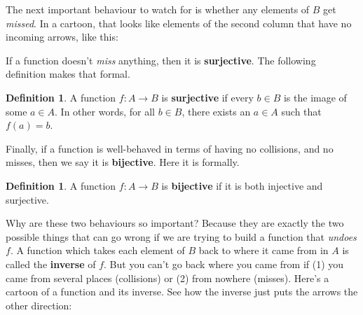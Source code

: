 \documentclass{article}
\theoremstyle{plain}
\theoremstyle{definition}
\newtheorem{definition}[theorem]{Definition}
\theoremstyle{remark}
\numberwithin{theorem}{section}
\begin{document}
The next important behaviour to watch for is whether any elements of $B$ get \emph{missed}.  In a cartoon, that looks like elements of the second column that have no incoming arrows, like this:

\begin{center}
\end{center}


If a function doesn't \emph{miss} anything, then it is \textbf{surjective}.  The following definition makes that formal.

\begin{definition}
    A function $f: A \rightarrow B$ is \textbf{surjective} if every $b \in B$ is the image of some $a \in A$.  In other words, for all $b \in B$, there exists an $a \in A$ such that $f(a) = b$.
\end{definition}

Finally, if a function is well-behaved in terms of having no collisions, and no misses, then we say it is \textbf{bijective}.  Here it is formally.

\begin{definition}
    A function $f: A \rightarrow B$ is \textbf{bijective} if it is both injective and surjective.
\end{definition}

Why are these two behaviours so important?  Because they are exactly the two possible things that can go wrong if we are trying to build a function that \emph{undoes} $f$.  A function which takes each element of $B$ back to where it came from in $A$ is called the \textbf{inverse} of $f$.  But you can't go back where you came from if (1) you came from several places (collisions) or (2) from nowhere (misses).  Here's a cartoon of a function and its inverse.  See how the inverse just puts the arrows the other direction:
\end{document}
